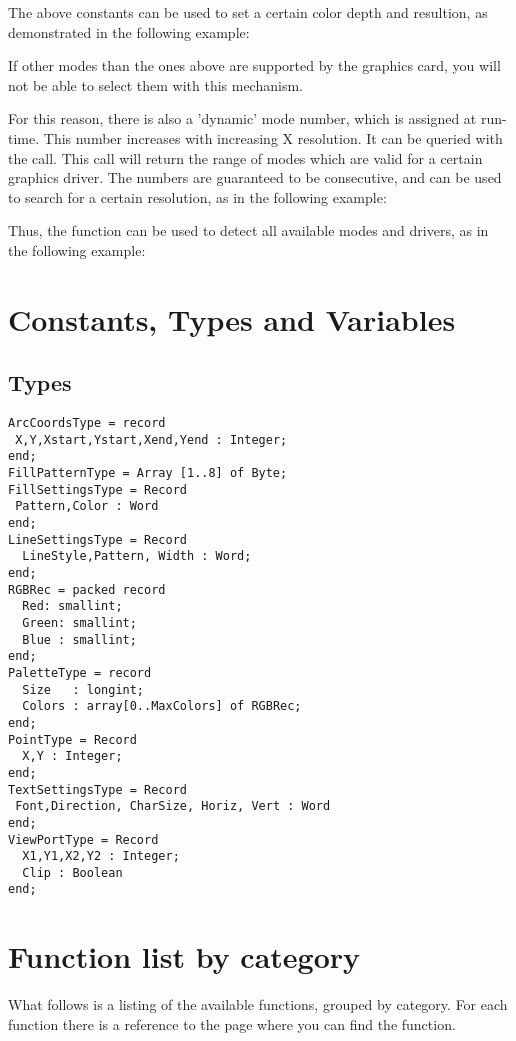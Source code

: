 The above constants can be used to set a certain color depth and resultion,
as demonstrated in the following example:


If other modes than the ones above are supported by the graphics card,
you will not be able to select them with this mechanism.

For this reason, there is also a 'dynamic' mode number, which is assigned at
run-time. This number increases with increasing X resolution. It can be
queried with the  call. This call will return the range
of modes which are valid for a certain graphics driver. The numbers are
guaranteed to be consecutive, and can be used to search for a certain 
resolution, as in the following example:



Thus, the  function can be used to detect all available 
modes and drivers, as in the following example:


\section{Constants, Types and Variables}
\subsection{Types}
\begin{verbatim}
ArcCoordsType = record
 X,Y,Xstart,Ystart,Xend,Yend : Integer;
end;
FillPatternType = Array [1..8] of Byte;
FillSettingsType = Record
 Pattern,Color : Word
end;
LineSettingsType = Record
  LineStyle,Pattern, Width : Word;
end;
RGBRec = packed record
  Red: smallint;
  Green: smallint;
  Blue : smallint;
end;
PaletteType = record
  Size   : longint;
  Colors : array[0..MaxColors] of RGBRec;
end;
PointType = Record
  X,Y : Integer;
end;
TextSettingsType = Record
 Font,Direction, CharSize, Horiz, Vert : Word
end;
ViewPortType = Record
  X1,Y1,X2,Y2 : Integer;
  Clip : Boolean
end;
\end{verbatim}

\section{Function list by category}
What follows is a listing of the available functions, grouped by category.
For each function there is a reference to the page where you can find the
function.
